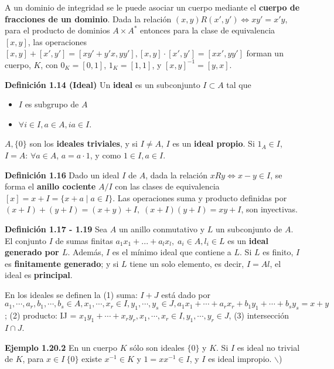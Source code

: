 \documentclass[a4paper, 11pt]{extarticle}
\newcommand{\defi}[1]{\textcolor{azul}{\textbf{Definición #1}}}
\newcommand{\ejem}[1]{\textcolor{verde}{\textbf{Ejemplo #1}}}
\begin{document}
\begin{multicols*}{2}
A un dominio de integridad se le puede asociar un cuerpo mediante el \textbf{cuerpo de
fracciones de un dominio}. 
Dada la relación \((x,y) R (x', y') \iff xy' = x'y\), para el producto de dominios \(A \times  A^*\) 
entonces para la clase de equivalencia \([x,y]\), las operaciones \([x,y] +
[x', y'] = [xy' + y'x, yy'], [x,y]\cdot [x',y'] = [xx', yy']\) forman un
cuerpo, \(K\), con \(0_K = [0, 1]\), \(1_K = [1,1]\), y \([x,y] ^{-1} =
 [y, x]\).

\defi{1.14 (Ideal)} Un \textbf{ideal} es un subconjunto \(I \subset A\) tal que \vspace{-1em}
\begin{itemize}
\item \(I\) es subgrupo de \(A\)
\item \(\forall i \in I, a \in A, ia \in I\).
\end{itemize}
\(A, \{ 0 \}\) son los \textbf{ideales triviales}, y si \(I \neq A\), \(I\) es un  
\textbf{ideal propio}. Si \(1_A \in I\), \(I = A\): \(\forall a \in A\), \(a = a
\cdot 1\), y como \(1 \in I, a \in I\).

\defi{1.16} Dado un ideal \(I\) de \(A\), dada la relación \(xRy \iff x-y
\in I\), se forma el \textbf{anillo cociente} \(A/I\) con las clases de equivalencia
\([x] = x + I = \{ x + a \;|\; a \in I  \}\).
Las operaciones suma y producto definidas por \((x + I) + (y + I) = (x + y) +
I, \; (x + I)(y + I) = xy + I\), son inyectivas.

\defi{1.17 - 1.19} Sea \(A\) un anillo conmutativo y \(L\) un subconjunto de \(A\). El conjunto \(I\) de sumas finitas \(a_1x_1 + ... + a_lx_l,\; a_i \in A,
l_i \in L\) es un \textbf{ideal generado por \(L\)}. Además, \(I\) es el mínimo 
ideal que contiene a \(L\). Si \(L\) es finito, \(I\) es \textbf{finitamente generado}; y si \(L\) tiene
un solo elemento, es decir, \(I = Al\), el ideal es \textbf{principal}.

En los ideales se definen la (1) suma: \(I + J\) está dado por \(a_1, \cdots,
a_r, b_1, \cdots, b_s \in A, x_1, \cdots, x_r \in I, y_1, \cdots, y_s \in J,
a_1x_1 + \cdots + a_rx_r + b_1y_1 + \cdots + b_sy_s = x + y\); (2) producto: IJ
= \(x_1y_1 + \cdots + x_ry_r, x_1, \cdots, x_r \in I, y_1, \cdots, y_r \in J\), (3) intersección \(I \cap J\).

\ejem{1.20.2} En un cuerpo \(K\) sólo son ideales \(\{0\}\) y \(K\). Si \(I\) es ideal no trivial de \(K\), para \(x \in I \ \{0\}\) existe \(x^{-1} \in
K\) y \(1 = xx^{-1} \in I\), y \(I\) es ideal impropio. $\backslash$)


\end{multicols*}
\end{document}

